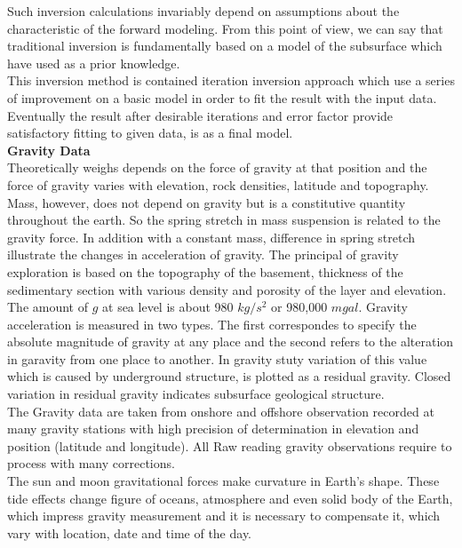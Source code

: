 Such inversion calculations invariably depend on assumptions about the characteristic of the forward modeling. From this point of view, we can say that traditional inversion is fundamentally based on a model of the subsurface which have used as a prior knowledge.\\
This inversion method is contained iteration inversion approach which use a series of improvement on a basic model in order to fit the result with the input data. Eventually the result after desirable iterations and error factor provide  satisfactory fitting to given data, is as a final model.\\


\textbf{Gravity Data} \\

Theoretically weighs depends on the force of gravity at that position and the force of gravity varies with elevation, rock densities, latitude and topography. Mass, however, does not depend on gravity but is a constitutive quantity throughout the earth. So the spring stretch in mass suspension is related to the gravity force. In addition with a constant mass, difference in spring stretch illustrate the changes in acceleration of gravity. The principal of gravity exploration is based on the topography of the basement, thickness of the sedimentary section with various density and porosity of the layer and elevation.\\

The amount of $g$ at sea level is about 980 $kg/s^2$ or 980,000 $mgal$. Gravity acceleration is measured in two types. The first correspondes to specify the absolute magnitude of gravity at any place and the second refers to the alteration in garavity from one place to another. In gravity stuty variation of this value which is caused by underground structure, is plotted as a residual gravity. Closed variation in residual gravity indicates subsurface geological structure.\\
The Gravity data are taken from onshore and offshore observation recorded at many gravity stations with high precision of determination in elevation and position (latitude and longitude). All Raw reading gravity observations require to process with many corrections.\\

The sun and moon gravitational forces make curvature in Earth's shape. These tide effects change figure of oceans, atmosphere and even solid body of the Earth, which impress gravity measurement and it is necessary to compensate it, which vary with location, date and time of the day.\\

